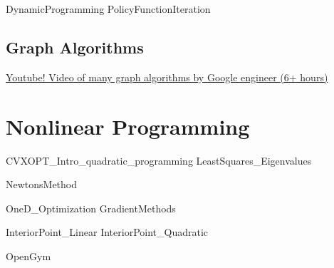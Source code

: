 \documentclass[letter,12pt]{book}
\renewcommand{\0}{\mathbf{0}}
\begin{document}






%



%


{DynamicProgramming}
{PolicyFunctionIteration}

\chapter{Graph Algorithms}
\href{https://www.youtube.com/watch?v=09_LlHjoEiY}{Youtube!  Video of many graph algorithms by Google engineer (6+ hours)}





\part{Nonlinear Programming}



{CVXOPT_Intro_quadratic_programming}
{LeastSquares_Eigenvalues}

{NewtonsMethod}



{OneD_Optimization}
{GradientMethods}

{InteriorPoint_Linear}
{InteriorPoint_Quadratic}

{OpenGym}
\end{document}
